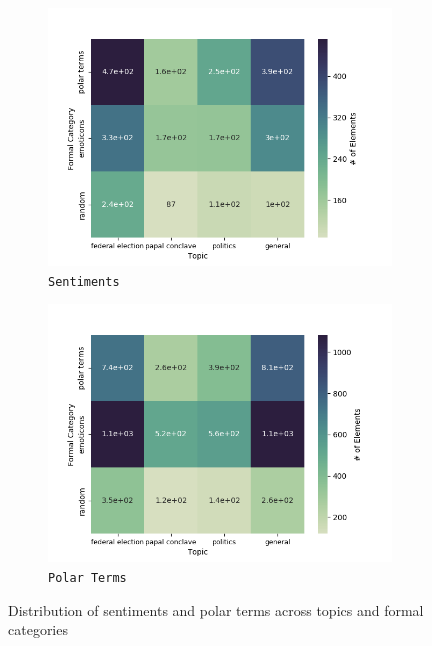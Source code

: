 \begin{figure}[htbp!]
{
\centering
\begin{subfigure}{.5\textwidth}
  \centering
  \includegraphics[width=\linewidth]{img/sentiment_stat.png}
  \caption{\texttt{Sentiments}}\label{snt:fig:crp-sent-emo-distr-a}
\end{subfigure}%
\begin{subfigure}{.5\textwidth}
  \centering
  \includegraphics[width=\linewidth]{img/emo-expression_stat.png}
  \caption{\texttt{Polar Terms}}\label{snt:fig:crp-sent-emo-distr-b}
\end{subfigure}
}
\caption{Distribution of sentiments and polar terms across topics and
  formal categories}\label{snt:fig:crp-sent-emo-distr}
\end{figure}

